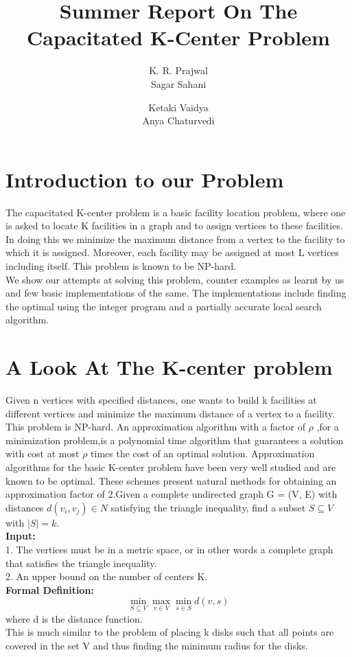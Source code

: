 \documentclass[12pt,a4paper,onecolumn]{article}
\author{K. R. Prajwal \\ Sagar Sahani \and  Ketaki Vaidya  \\Anya Chaturvedi }
\title{Summer Report On The Capacitated K-Center Problem}
\begin{document}
\maketitle
\section{Introduction to our Problem}
The capacitated K-center problem is a basic facility location problem, where one is asked to locate K facilities in a graph and to assign vertices to these facilities. In doing this we minimize
the maximum distance from a vertex to the facility to which it is assigned. Moreover, each facility
may be assigned at most L vertices including itself. This problem is known to be NP-hard.\\
We show our attempts at solving this problem, counter examples as learnt by us and few basic implementations of the same. The implementations include finding the optimal using the integer program and a partially accurate local search algorithm.
\section{A Look At The K-center problem}
Given n vertices with specified distances, one wants to build k facilities at different vertices and minimize the maximum distance of a vertex to a facility. This problem is NP-hard. An approximation algorithm with a factor of $\rho$ ,for a minimization problem,is
a polynomial time algorithm that guarantees a solution with cost at most $\rho$ times
the cost of an optimal solution. Approximation algorithms for the basic K-center
problem have been very well studied and are known to be optimal.
These schemes present natural methods for obtaining an approximation factor of 2.Given a complete undirected graph G = (V, E) with distances $d(v_i, v_j) \in N$ satisfying the triangle inequality, find a subset $S \subseteq V$ with $|S| = k$.\\ \textbf{Input:}\\1. The vertices must be in a metric space, or in other words a complete graph that satisfies the triangle inequality.\\2. An
upper bound on the number of centers K.\\
\textbf{Formal Definition:}\\
$$\min_{S \subseteq V}\max_{v \in V}\min_{s \in S}d(v,s)$$
where d is the distance function.\\
This is much similar to the problem of placing k disks such that all points are covered in the set V and thus finding the minimum radius for the disks.
\end{document}

